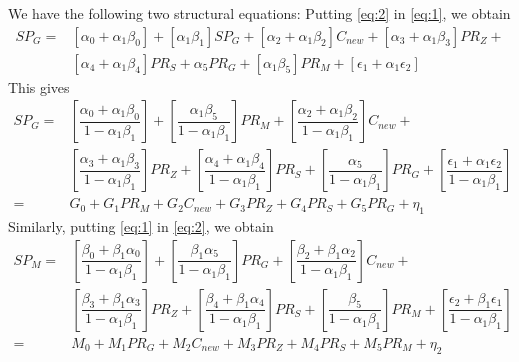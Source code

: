 \documentclass[12pt, a4paper]{article}
\begin{document}
\noindent \textbf{\color{purple}{Solving the Simultaneous Equations System:}}

\noindent We have the following two structural equations:
\color{black}{}
Putting \eqref{eq:2} in \eqref{eq:1}, we obtain
\begin{align*}
    SP_{G} = & \left[\alpha_{0}+\alpha_{1}\beta_{0}\right]+\left[\alpha_{1}\beta_{1}\right]SP_{G}+\left[\alpha_{2}+\alpha_{1}\beta_{2}\right]C_{new}+\left[\alpha_{3}+\alpha_{1}\beta_{3}\right]PR_{Z}+\\
    & \left[\alpha_{4}+\alpha_{1}\beta_{4}\right]PR_{S}  +\alpha_{5}PR_{G}+\left[\alpha_{1}\beta_{5}\right]PR_{M}+\left[\epsilon_{1}+\alpha_{1}\epsilon_{2}\right]
\end{align*}
This gives
\begin{align*}
    SP_{G} = & \left[\dfrac{\alpha_{0}+\alpha_{1}\beta_{0}}{1-\alpha_{1}\beta_{1}}\right]+\left[\dfrac{\alpha_{1}\beta_{5}}{1-\alpha_{1}\beta_{1}}\right]PR_{M}+\left[\dfrac{\alpha_{2}+\alpha_{1}\beta_{2}}{1-\alpha_{1}\beta_{1}}\right]C_{new}+\\
    & \left[\dfrac{\alpha_{3}+\alpha_{1}\beta_{3}}{1-\alpha_{1}\beta_{1}}\right]PR_{Z}+\left[\dfrac{\alpha_{4}+\alpha_{1}\beta_{4}}{1-\alpha_{1}\beta_{1}}\right]PR_{S}  +\left[\dfrac{\alpha_{5}}{1-\alpha_{1}\beta_{1}}\right]PR_{G}+\left[\dfrac{\epsilon_{1}+\alpha_{1}\epsilon_{2}}{1-\alpha_{1}\beta_{1}}\right] \\
    = & G_{0}+G_{1}PR_{M}+G_{2}C_{new}+G_{3}PR_{Z}+G_{4}PR_{S}+G_{5}PR_{G}+\eta_{1}
\end{align*}
Similarly, putting \eqref{eq:1} in \eqref{eq:2}, we obtain
\begin{align*}
    SP_{M} = & \left[\dfrac{\beta_{0}+\beta_{1}\alpha_{0}}{1-\alpha_{1}\beta_{1}}\right]+\left[\dfrac{\beta_{1}\alpha_{5}}{1-\alpha_{1}\beta_{1}}\right]PR_{G}+\left[\dfrac{\beta_{2}+\beta_{1}\alpha_{2}}{1-\alpha_{1}\beta_{1}}\right]C_{new}+\\
    & \left[\dfrac{\beta_{3}+\beta_{1}\alpha_{3}}{1-\alpha_{1}\beta_{1}}\right]PR_{Z}+ \left[\dfrac{\beta_{4}+\beta_{1}\alpha_{4}}{1-\alpha_{1}\beta_{1}}\right]PR_{S}  +\left[\dfrac{\beta_{5}}{1-\alpha_{1}\beta_{1}}\right]PR_{M}+\left[\dfrac{\epsilon_{2}+\beta_{1}\epsilon_{1}}{1-\alpha_{1}\beta_{1}}\right] \\
    = & M_{0}+M_{1}PR_{G}+M_{2}C_{new}+M_{3}PR_{Z}+M_{4}PR_{S}+M_{5}PR_{M}+\eta_{2}
\end{align*}
\end{document}
